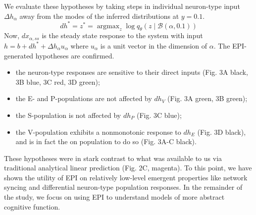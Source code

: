 \documentclass[11pt]{article}
\DeclareMathOperator*{\argmax}{argmax}
\begin{document}
We evaluate these hypotheses by taking steps in individual neuron-type input $\Delta h_\alpha$ away from the modes of the inferred distributions at $y=0.1$.
\begin{equation}
dh^* = z^* = \argmax_{z} \log q_\theta(z \mid \mathcal{B}(\alpha, 0.1))
\end{equation}
Now, $dx_{\alpha,ss}$ is the steady state response to the system with input $h = b + dh^* + \Delta h_\alpha u_\alpha$ where $u_\alpha$ is a unit vector in the dimension of $\alpha$. The EPI-generated  hypotheses are confirmed. 
\begin{itemize}
\item the neuron-type responses are sensitive to their direct inputs (Fig. 3A black, 3B blue, 3C red, 3D green);
\item  the E- and P-populations are not affected by $dh_V$ (Fig. 3A green, 3B green);
\item the S-population is not affected by $dh_P$ (Fig. 3C blue);
\item the V-population exhibits a nonmonotonic response to $dh_E$ (Fig. 3D black), and is in fact the on population to do so (Fig. 3A-C black).
\end{itemize}

These hypotheses were in stark contrast to what was available to us via traditional analytical linear prediction (Fig. 2C, magenta).
To this point, we have shown the utility of EPI on relatively low-level emergent properties like network syncing and differential neuron-type population responses.  
In the remainder of the study, we focus on using EPI to understand models of more abstract cognitive function.

\end{document}
